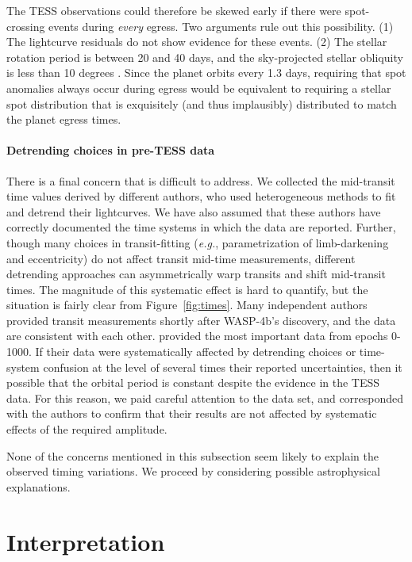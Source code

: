 \documentclass[12pt,twocolumn,tighten]{aastex62}
\begin{document}
The TESS observations could therefore be skewed
early if there were spot-crossing events during {\it every} egress.  Two
arguments rule out this possibility.  (1) The lightcurve residuals do
not show evidence for these events.  (2) The stellar rotation period
is between 20 and 40 days, and the sky-projected stellar obliquity is
less than 10 degrees
\citep{triaud_spin-orbit_2010,sanchis-ojeda_starspots_2011,hoyer_tramos_2013}.
Since the planet orbits every 1.3 days, requiring that spot anomalies
always occur during egress would be equivalent to requiring a stellar
spot distribution that is exquisitely (and thus implausibly)
distributed to match the planet egress times.

\paragraph{Detrending choices in pre-TESS data}
There is a final concern that is difficult to address.  We collected
the mid-transit time values derived by different authors, who used
heterogeneous methods to fit and detrend their lightcurves.  We have
also assumed that these authors have correctly documented the time
systems in which the data are reported.  Further, though many choices
in transit-fitting ({\it e.g.}, parametrization of limb-darkening and
eccentricity) do not affect transit mid-time measurements, different
detrending approaches can asymmetrically warp transits and shift
mid-transit times.  The magnitude of this systematic effect is hard to
quantify, but the situation is fairly clear from
Figure~\ref{fig:times}.  Many independent authors provided transit
measurements shortly after WASP-4b's discovery, and the data are
consistent with each other. \citet{huitson_gemini_2017} provided the
most important data from epochs 0-1000. If their data were
systematically affected by detrending choices or time-system confusion
at the level of several times their reported uncertainties, then it
possible that the orbital period is constant despite the evidence in
the TESS data.  For this reason, we paid careful attention to the
\citet{huitson_gemini_2017} data set, and corresponded with the
authors to confirm that their results are not affected by systematic
effects of the required amplitude.

None of the concerns mentioned in this subsection seem likely to
explain the observed timing variations. We proceed by considering
possible astrophysical explanations.

\section{Interpretation}
\label{sec:implications}
\end{document}
